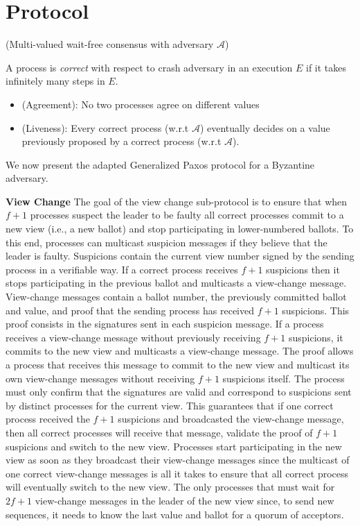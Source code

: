 \section{Protocol}
%
\begin{definition}
(Multi-valued wait-free consensus with adversary $\mathcal{A}$)

A process is \emph{correct} with respect to crash adversary 
in an execution $E$ if it takes infinitely many steps in $E$.
%
\begin{itemize}
\item (Agreement): No two processes agree on different values  
\item (Liveness): Every correct process (w.r.t $\mathcal{A}$) 
eventually decides on a value previously proposed by a correct process (w.r.t $\mathcal{A}$).
\end{itemize}
%
\end{definition}
%

%
\newpage
We now present the adapted Generalized Paxos protocol for a Byzantine adversary.\par
\textbf{View Change} The goal of the view change sub-protocol is to ensure that when $f+1$ processes suspect the leader to be faulty all correct processes commit to a new view (i.e., a new ballot) and stop participating in lower-numbered ballots. To this end, processes can multicast suspicion messages if they believe that the leader is faulty. Suspicions contain the current view number signed by the sending process in a verifiable way. If a correct process receives $f+1$ suspicions then it stops participating in the previous ballot and multicasts a view-change message. View-change messages contain a ballot number, the previously committed ballot and value, and proof that the sending process has received $f+1$ suspicions. This proof consists in the signatures sent in each suspicion message. If a process receives a view-change message without previously receiving $f+1$ suspicions, it commits to the new view and multicasts a view-change message.  The proof allows a process that receives this message to commit to the new view and multicast its own view-change messages without receiving $f+1$ suspicions itself. The process must only confirm that the signatures are valid and correspond to suspicions sent by distinct processes for the current view. This guarantees that if one correct process received the $f+1$ suspicions and broadcasted the view-change message, then all correct processes will receive that message, validate the proof of $f+1$ suspicions and switch to the new view. Processes start participating in the new view as soon as they broadcast their view-change messages since the multicast of one correct view-change messages is all it takes to ensure that all correct process will eventually switch to the new view. The only processes that must wait for $2f+1$ view-change messages in the leader of the new view since, to send new sequences, it needs to know the last value and ballot for a quorum of acceptors.\par
